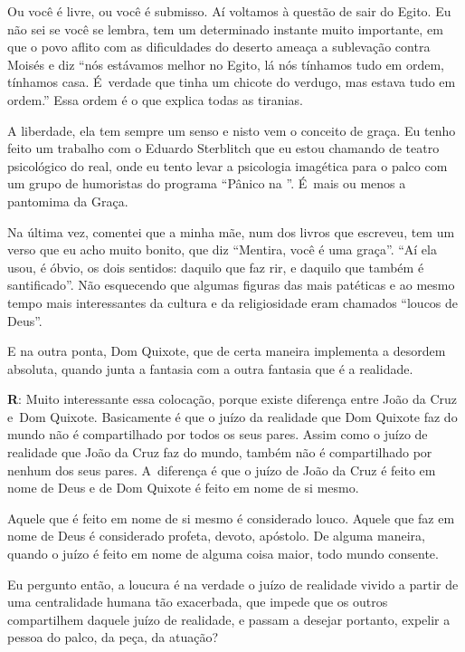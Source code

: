  

Ou você é livre, ou você é submisso. Aí voltamos à questão de sair do
Egito. Eu não sei se você se lembra, tem um determinado instante muito
importante, em que o povo aflito com as dificuldades do deserto ameaça a
sublevação contra Moisés e diz ``nós estávamos melhor no Egito, lá nós
tínhamos tudo em ordem, tínhamos casa. É~verdade que tinha um chicote do
verdugo, mas estava tudo em ordem.'' Essa ordem é o que explica todas as
tiranias.

 

A liberdade, ela tem sempre um senso e nisto vem o conceito de graça. Eu
tenho feito um trabalho com o Eduardo Sterblitch que eu estou chamando
de teatro psicológico do real, onde eu tento levar a psicologia
imagética para o palco com um grupo de humoristas do programa ``Pânico
na ''. É~mais ou menos a pantomima da Graça.

 

Na última vez, comentei que a minha mãe, num dos livros que escreveu,
tem um verso que eu acho muito bonito, que diz ``Mentira, você é uma
graça''. ``Aí ela usou, é óbvio, os dois sentidos: daquilo que faz rir,
e daquilo que também é santificado''. Não esquecendo que algumas figuras
das mais patéticas e ao mesmo tempo mais interessantes da cultura e da
religiosidade eram chamados ``loucos de Deus''.

 

E na outra ponta, Dom Quixote, que de certa maneira implementa a
desordem absoluta, quando junta a fantasia com a outra fantasia que é a
realidade.

 

\textbf{R}: Muito interessante essa colocação, porque existe diferença
entre João da Cruz e\textbf{}~Dom Quixote. Basicamente é que o juízo da
realidade que Dom Quixote faz do mundo não é compartilhado por todos os
seus pares. Assim como o juízo de realidade que João da Cruz faz do
mundo, também não é compartilhado por nenhum dos seus pares. A~diferença
é que o juízo de João da Cruz é feito em nome de Deus e de Dom Quixote é
feito em nome de si mesmo.

 

Aquele que é feito em nome de si mesmo é considerado louco. Aquele que
faz em nome de Deus é considerado profeta, devoto, apóstolo. De alguma
maneira, quando o juízo é feito em nome de alguma coisa maior, todo mundo
consente.

 

Eu pergunto então, a loucura é na verdade o juízo de realidade vivido a
partir de uma centralidade humana tão exacerbada, que impede que os
outros compartilhem daquele juízo de realidade, e passam a desejar
portanto, expelir a pessoa do palco, da peça, da atuação?

